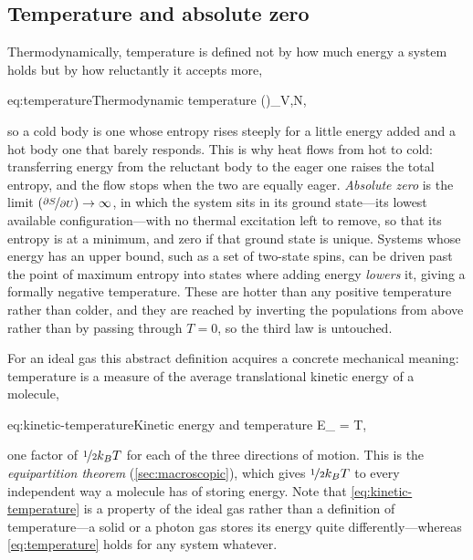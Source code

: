     \subsection{Temperature and absolute zero}
    \label{sec:temperature}

        Thermodynamically, temperature is defined not by how much energy a system holds but by how reluctantly it accepts more,

        \begin{keyeq}{eq:temperature}{Thermodynamic temperature}
             \equiv \left(\right)_{V,N},
        \end{keyeq}

        so a cold body is one whose entropy rises steeply for a little energy added and a hot body one that barely responds. This is why heat flows from hot to cold: transferring energy from the reluctant body to the eager one raises the total entropy, and the flow stops when the two are equally eager. \emph{Absolute zero} is the limit $\left(\nicefrac{\partial S}{\partial U}\right)\to\infty$, in which the system sits in its ground state---its lowest available configuration---with no thermal excitation left to remove, so that its entropy is at a minimum, and zero if that ground state is unique. Systems whose energy has an upper bound, such as a set of two-state spins, can be driven past the point of maximum entropy into states where adding energy \emph{lowers} it, giving a formally negative temperature. These are hotter than any positive temperature rather than colder, and they are reached by inverting the populations from above rather than by passing through $T=0$, so the third law is untouched.

        For an ideal gas this abstract definition acquires a concrete mechanical meaning: temperature is a measure of the average translational kinetic energy of a molecule,

        \begin{keyeq}{eq:kinetic-temperature}{Kinetic energy and temperature}
            \left\langle E_{} \right\rangle =  \kB T,
        \end{keyeq}

        one factor of $\nicefrac{1}{2}k_{B} T$ for each of the three directions of motion. This is the \emph{equipartition theorem} (\cref{sec:macroscopic}), which gives $\nicefrac{1}{2}k_{B} T$ to every independent way a molecule has of storing energy. Note that \cref{eq:kinetic-temperature} is a property of the ideal gas rather than a definition of temperature---a solid or a photon gas stores its energy quite differently---whereas \cref{eq:temperature} holds for any system whatever.

